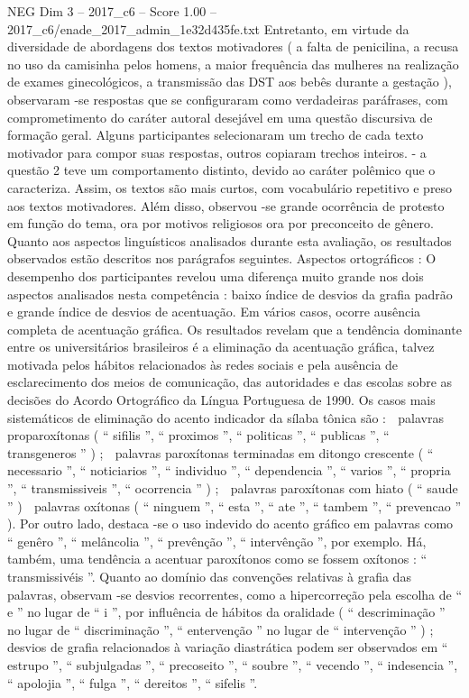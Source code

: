 \begin{textsample}{NEG Dim 3 – 2017\_c6 – Score 1.00 – 2017\_c6/enade\_2017\_admin\_1e32d435fe.txt}
Entretanto, em virtude da diversidade de abordagens dos textos motivadores ( a falta de penicilina, a recusa no uso da camisinha pelos homens, a maior frequência das mulheres na realização de exames ginecológicos, a transmissão das DST aos bebês durante a gestação ), observaram -se respostas que se configuraram como verdadeiras paráfrases, com comprometimento do caráter autoral desejável em uma questão discursiva de formação geral.
Alguns participantes selecionaram um trecho de cada texto motivador para compor suas respostas, outros copiaram trechos inteiros. - a questão 2 teve um comportamento distinto, devido ao caráter polêmico que o caracteriza.
Assim, os textos são mais curtos, com vocabulário repetitivo e preso aos textos motivadores.
Além disso, observou -se grande ocorrência de protesto em função do tema, ora por motivos religiosos ora por preconceito de gênero.
Quanto aos aspectos linguísticos analisados durante esta avaliação, os resultados observados estão descritos nos parágrafos seguintes.
Aspectos ortográficos : O desempenho dos participantes revelou uma diferença muito grande nos dois aspectos analisados nesta competência : baixo índice de desvios da grafia padrão e grande índice de desvios de acentuação.
Em vários casos, ocorre ausência completa de acentuação gráfica.
Os resultados revelam que a tendência dominante entre os universitários brasileiros é a eliminação da acentuação gráfica, talvez motivada pelos hábitos relacionados às redes sociais e pela ausência de esclarecimento dos meios de comunicação, das autoridades e das escolas sobre as decisões do Acordo Ortográfico da Língua Portuguesa de 1990.
Os casos mais sistemáticos de eliminação do acento indicador da sílaba tônica são :  palavras proparoxítonas ( “ sifilis ”, “ proximos ”, “ politicas ”, “ publicas ”, “ transgeneros ” ) ;  palavras paroxítonas terminadas em ditongo crescente ( “ necessario ”, “ noticiarios ”, “ individuo ”, “ dependencia ”, “ varios ”, “ propria ”, “ transmissiveis ”, “ ocorrencia ” ) ;  palavras paroxítonas com hiato ( “ saude ” )  palavras oxítonas ( “ ninguem ”, “ esta ”, “ ate ”, “ tambem ”, “ prevencao ” ).
Por outro lado, destaca -se o uso indevido do acento gráfico em palavras como “ genêro ”, “ melâncolia ”, “ prevênção ”, “ intervênção ”, por exemplo.
Há, também, uma tendência a acentuar paroxítonos como se fossem oxítonos : “ transmissivéis ”.
Quanto ao domínio das convenções relativas à grafia das palavras, observam -se desvios recorrentes, como a hipercorreção pela escolha de “ e ” no lugar de “ i ”, por influência de hábitos da oralidade ( “ descriminação ” no lugar de “ discriminação ”, “ entervenção ” no lugar de “ intervenção ” ) ; desvios de grafia relacionados à variação diastrática podem ser observados em “ estrupo ”, “ subjulgadas ”, “ precoseito ”, “ soubre ”, “ vecendo ”, “ indesencia ”, “ apolojia ”, “ fulga ”, “ dereitos ”, “ sifelis ”.

\end{textsample}
